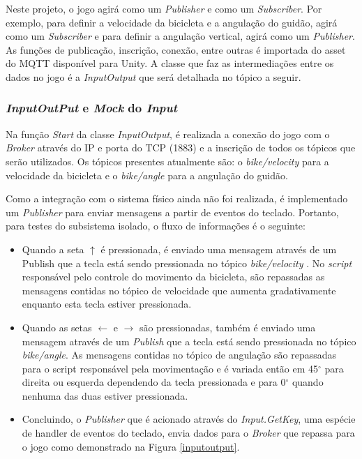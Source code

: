     
	Neste projeto, o jogo agirá como um \textit{Publisher} e como um \textit{Subscriber}. Por exemplo, para definir a velocidade da bicicleta e a angulação do guidão, agirá como um \textit{Subscriber} e para definir a angulação vertical, agirá como um \textit{Publisher}. As funções de publicação, inscrição, conexão, entre outras é importada do asset do MQTT disponível para Unity.  A classe que faz as intermediações entre os dados no jogo é a \textit{InputOutput} que será detalhada no tópico a seguir.

\subsubsection{\textit{InputOutPut} e \textit{Mock} do \textit{Input}}

	Na função \textit{Start} da classe  \textit{InputOutput}, é realizada a conexão do jogo com o \textit{Broker} através do IP e porta do TCP (1883) e a inscrição de todos os tópicos que serão utilizados. Os tópicos presentes atualmente são: o \textit{bike/velocity} para a velocidade da bicicleta e o \textit{bike/angle} para a angulação do guidão. 

	Como a integração com o sistema físico ainda não foi realizada, é implementado um \textit{Publisher} para enviar mensagens a partir de eventos do teclado. Portanto, para testes do subsistema isolado, o fluxo de informações é o seguinte: 

\begin{itemize}
\item Quando a seta ${\uparrow}$ é pressionada, é enviado uma mensagem através de um Publish que a tecla está sendo pressionada no tópico \textit{bike/velocity} . No \textit{script} responsável pelo controle do movimento da bicicleta, são repassadas as mensagens contidas no tópico de velocidade que aumenta gradativamente enquanto esta tecla estiver pressionada.
\item Quando as setas ${\leftarrow}$ e ${\rightarrow}$ são pressionadas, também é enviado uma mensagem através de um \textit{Publish} que a tecla está sendo pressionada no tópico \textit{bike/angle}. As mensagens contidas no tópico de angulação são repassadas para o script responsável pela movimentação e é variada então em 45$^{\circ}$  para direita ou esquerda dependendo da tecla pressionada e para 0$^{\circ}$  quando nenhuma das duas estiver pressionada.
\item Concluindo, o \textit{Publisher} que é acionado através do \textit{Input.GetKey}, uma espécie de handler de eventos do teclado,  envia dados para o \textit{Broker} que repassa para o jogo como demonstrado na Figura \ref{inputoutput}.
\end{itemize}


